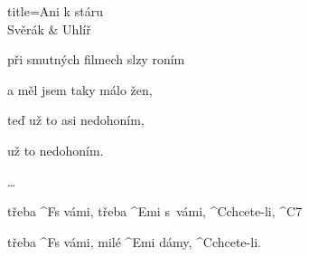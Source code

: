 \begin{song}{title=\predtitle \centering Ani k stáru \\\large Svěrák \& Uhlíř   \vspace*{-0.3cm}}
\begin{centerjustified}
\begin{varwidth}[t]{0.48\textwidth}
    při smutných filmech slzy roním

    a měl jsem taky málo žen,

    teď už to asi nedohoním,

    už to nedohoním.

\dots

	třeba ^{F}s vámi, třeba ^{Emi \z}s~vámi, ^{\z C}chcete-li, ^{C7}

	třeba ^{F}s vámi, milé ^{Emi \z}dámy, ^{\z C}chcete-li.

\end{varwidth}

\end{centerjustified}
\setcounter{Slokočet}{0}
\end{song}


